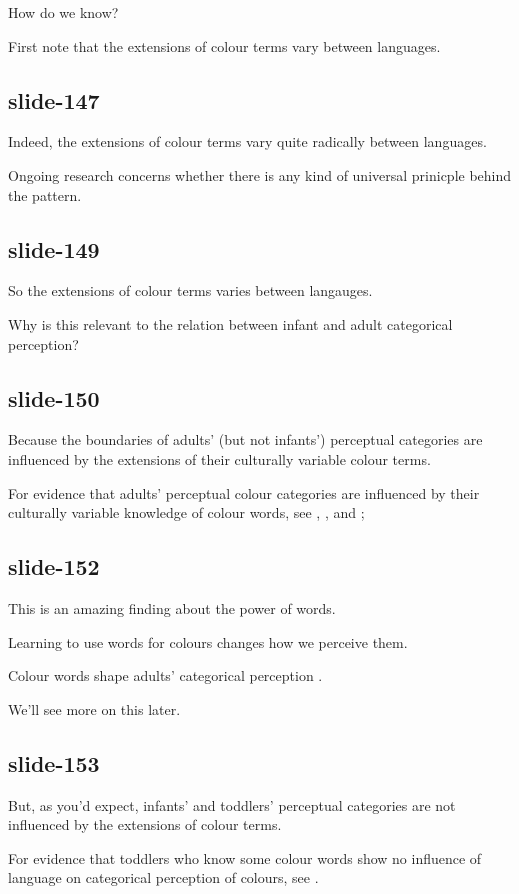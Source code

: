 \documentclass[12pt,\papersize]{extarticle}
\begin{document}
How do we know?
 
First note that the extensions of colour terms vary between languages.
 
\subsection{slide-147}
Indeed, the extensions of colour terms vary quite radically between languages.
 
Ongoing research concerns whether there is any kind of universal prinicple behind the pattern.
 
\subsection{slide-149}
So the extensions of colour terms varies between langauges.
 
Why is this relevant to the relation between infant and adult categorical perception?
 
\subsection{slide-150}
Because the boundaries of adults' (but not infants') perceptual categories are influenced by the extensions of their culturally variable colour terms.
 
For evidence that adults' perceptual colour categories are influenced by their culturally variable knowledge of colour words, see \citet{Kay:2006ly}, \citet{Roberson:2007wg}, and \citet{Winawer:2007im};
 
\subsection{slide-152}
This is an amazing finding about the power of words.
 
Learning to use words for colours changes how we perceive them.
 
Colour words shape adults’ categorical perception \citep{Roberson:2007wg,Winawer:2007im}.
 
We'll see more on this later.
 
\subsection{slide-153}
But, as you'd expect, infants’ and toddlers’ perceptual categories are not influenced by the extensions of colour terms.
 
For evidence that toddlers who know some colour words show no influence of language on categorical perception of colours, see \citet{Franklin:2005hp}.
 
\end{document}
